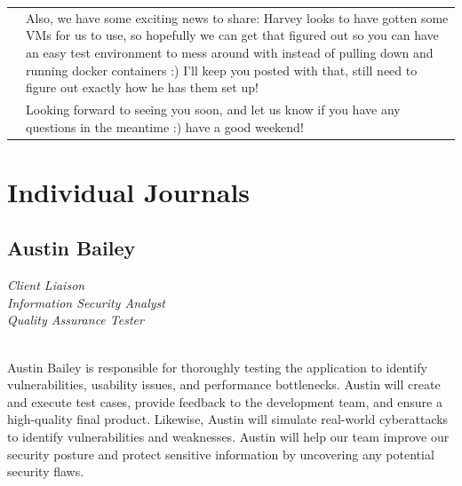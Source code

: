 \documentclass[oneside,openany,obeyspaces]{book}
\newcommand\tab[1][1cm]{\hspace*{#1}}
\begin{document}
\begin{flushleft}
\begin{center}
\begin{longtable}{ p{1.5cm} p{13.5cm} }
                                    & Also, we have some exciting news to share: Harvey looks to have gotten some VMs for us to use, so hopefully we can get that figured out so you can have an easy test environment to mess around with instead of pulling down and running docker containers :) I'll keep you posted with that, still need to figure out exactly how he has them set up!                                                                                                                                                                                                                                                                                                                                  \\

                                    & Looking forward to seeing you soon, and let us know if you have any questions in the meantime :) have a good weekend!                                                                                                                                                                                                                                                                                                                                                                                                                                                                                                                                                                   \\ \hline
        \end{longtable}
    \end{center}


    \section{Individual Journals}

    \subsection{Austin Bailey}

    \textit{Client Liaison\\
        Information Security Analyst\\
        Quality Assurance Tester\\~\\}

    \tab Austin Bailey is responsible for thoroughly testing the application to identify vulnerabilities, usability issues, and performance bottlenecks. Austin will create and execute test cases, provide feedback to the development team, and ensure a high-quality final product. Likewise, Austin will simulate real-world cyberattacks to identify vulnerabilities and weaknesses. Austin will help our team improve our security posture and protect sensitive information by uncovering any potential security flaws.\\~\\


\end{flushleft}
\end{document}
